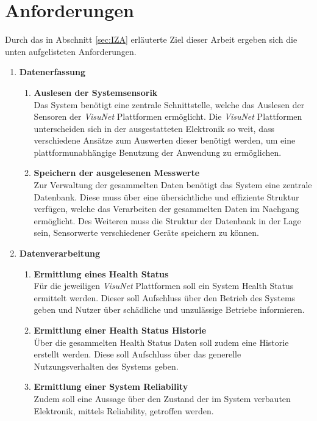 \section{Anforderungen}\label{sec:Anforderungen}
Durch das in Abschnitt \ref{sec:IZA} erläuterte Ziel dieser Arbeit ergeben sich die unten aufgelisteten Anforderungen.
\begin{enumerate}
    \item \textbf{Datenerfassung}
    \begin{enumerate}
        \item \textbf{Auslesen der Systemsensorik}\\
        Das System benötigt eine zentrale Schnittstelle, welche das Auslesen der Sensoren der \textit{VisuNet} Plattformen ermöglicht. Die \textit{VisuNet} Plattformen unterscheiden sich in der ausgestatteten Elektronik so weit, dass verschiedene Ansätze zum Auswerten dieser benötigt werden, um eine plattformunabhängige Benutzung der Anwendung zu ermöglichen. 
        \item \textbf{Speichern der ausgelesenen Messwerte}\\
        Zur Verwaltung der gesammelten Daten benötigt das System eine zentrale Datenbank. Diese muss über eine übersichtliche und effiziente Struktur verfügen, welche das Verarbeiten der gesammelten Daten im Nachgang ermöglicht. Des Weiteren muss die Struktur der Datenbank in der Lage sein, Sensorwerte verschiedener Geräte speichern zu können.
    \end{enumerate}
    
    \item \textbf{Datenverarbeitung}
    \begin{enumerate}
        \item \textbf{Ermittlung eines Health Status}\\
        Für die jeweiligen \textit{VisuNet} Plattformen soll ein System Health Status ermittelt werden. Dieser soll Aufschluss über den Betrieb des Systems geben und Nutzer über schädliche und unzulässige Betriebe informieren.  
        \item \textbf{Ermittlung einer Health Status Historie}\\
        Über die gesammelten Health Status Daten soll zudem eine Historie erstellt werden. Diese soll Aufschluss über das generelle Nutzungsverhalten des Systems geben. 
        \item \textbf{Ermittlung einer System Reliability}\\
        Zudem soll eine Aussage über den Zustand der im System verbauten Elektronik, mittels Reliability, getroffen werden. 
    \end{enumerate}


\end{enumerate}
